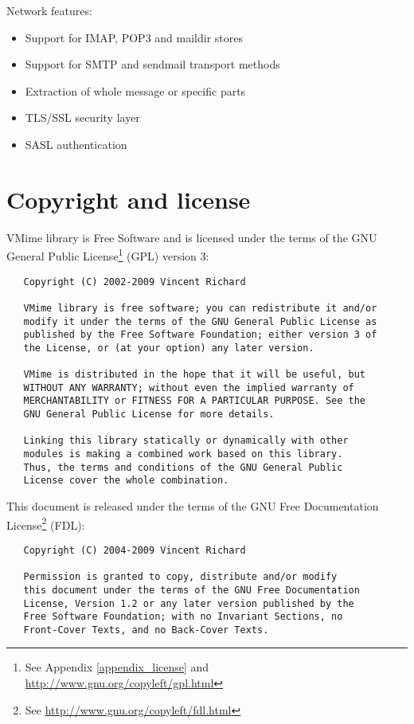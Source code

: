 \noindent Network features:

\begin{itemize}
\item Support for IMAP, POP3 and maildir stores
\item Support for SMTP and sendmail transport methods
\item Extraction of whole message or specific parts
\item TLS/SSL security layer
\item SASL authentication
\end{itemize}


\section{Copyright and license}

VMime library is Free Software and is licensed under the terms of the GNU
General Public License\footnote{See Appendix \ref{appendix_license} and
\url{http://www.gnu.org/copyleft/gpl.html}} (GPL) version 3:

\begin{verbatim}
   Copyright (C) 2002-2009 Vincent Richard

   VMime library is free software; you can redistribute it and/or
   modify it under the terms of the GNU General Public License as
   published by the Free Software Foundation; either version 3 of
   the License, or (at your option) any later version.

   VMime is distributed in the hope that it will be useful, but
   WITHOUT ANY WARRANTY; without even the implied warranty of
   MERCHANTABILITY or FITNESS FOR A PARTICULAR PURPOSE. See the
   GNU General Public License for more details.

   Linking this library statically or dynamically with other
   modules is making a combined work based on this library.
   Thus, the terms and conditions of the GNU General Public
   License cover the whole combination.
\end{verbatim}

\newpage
\noindent This document is released under the terms of the
GNU Free Documentation
License\footnote{See \url{http://www.gnu.org/copyleft/fdl.html}} (FDL):

\begin{verbatim}
   Copyright (C) 2004-2009 Vincent Richard

   Permission is granted to copy, distribute and/or modify
   this document under the terms of the GNU Free Documentation
   License, Version 1.2 or any later version published by the
   Free Software Foundation; with no Invariant Sections, no
   Front-Cover Texts, and no Back-Cover Texts.
\end{verbatim}

